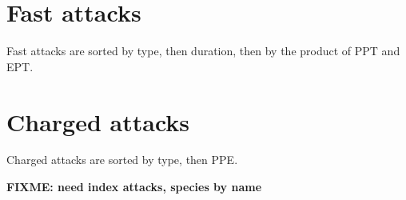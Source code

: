 \documentclass[ebook,10pt,openany,oneside]{memoir}
\begin{document}
\section{Fast attacks}
\label{sec:usersfast}
Fast attacks are sorted by type, then duration, then by the product of PPT and EPT\@.


\section{Charged attacks}
\label{sec:userscharged}
Charged attacks are sorted by type, then PPE\@.


\textbf{FIXME: need index attacks, species by name}

\backmatter

\end{document}
